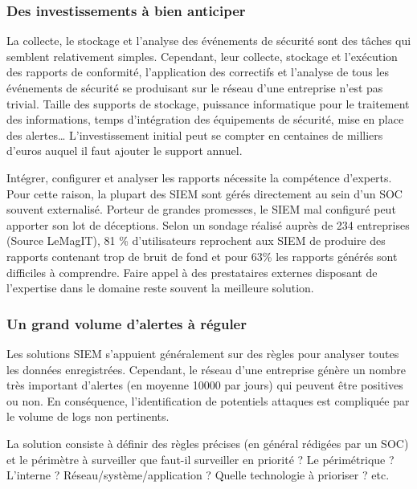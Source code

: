 \subsubsection{Des investissements à bien anticiper }

La collecte, le stockage et l’analyse des événements de sécurité sont des tâches qui semblent relativement simples. Cependant, leur collecte, stockage et l’exécution des rapports de conformité, l’application des correctifs et l’analyse de tous les événements de sécurité se produisant sur le réseau d’une entreprise n’est pas trivial. Taille des supports de stockage, puissance informatique pour le traitement des informations, temps d’intégration des équipements de sécurité, mise en place des alertes… L’investissement initial peut se compter en centaines de milliers d’euros auquel il faut ajouter le support annuel. 

Intégrer, configurer et analyser les rapports nécessite la compétence d’experts. Pour cette raison, la plupart des SIEM sont gérés directement au sein d’un SOC souvent externalisé. Porteur de grandes promesses, le SIEM mal configuré peut apporter son lot de déceptions. Selon un sondage réalisé auprès de 234 entreprises (Source LeMagIT), 81 \% d’utilisateurs reprochent aux SIEM de produire des rapports contenant trop de bruit de fond et pour 63\% les rapports générés sont difficiles à comprendre. Faire appel à des prestataires externes disposant de l’expertise dans le domaine reste souvent la meilleure solution.  



\subsubsection{Un grand volume d’alertes à réguler }

Les solutions SIEM s’appuient généralement sur des règles pour analyser toutes les données enregistrées. Cependant, le réseau d’une entreprise génère un nombre très important d'alertes (en moyenne 10000 par jours) qui peuvent être positives ou non. En conséquence, l’identification de potentiels attaques est compliquée par le volume de logs non pertinents. 

La solution consiste à définir des règles précises (en général rédigées par un SOC) et le périmètre à surveiller que faut-il surveiller en priorité ? Le périmétrique ? L’interne ? Réseau/système/application ? Quelle technologie à prioriser ? etc. 

